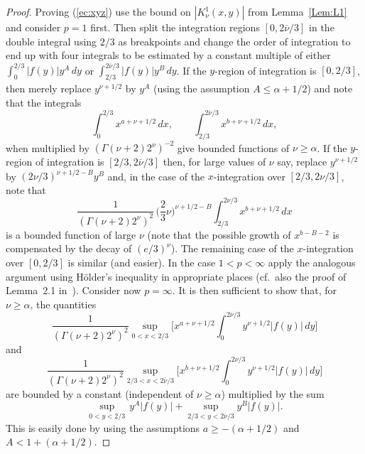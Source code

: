 \documentclass[leqno,a4paper]{amsart}
\newcommand{\overnu}{\overline{\nu}}
\begin{document}
\begin{proof}
Proving (\ref{ec:xyz}) use the bound on $|K_\nu^1(x,y)|$ from
Lemma~\ref{Lem:L1} and consider $p=1$ first. Then split the integration
regions $[0,2\overnu/3]$ in the double integral using $2/3$ as
breakpoints and change
the order of integration to end up with four integrals to be estimated by
a constant multiple of either
$\int_0^{2/3}|f(y)|y^A\,dy$ or $\int_{2/3}^{2\overnu/3}|f(y)|y^B\,dy$.
If the $y$-region of integration is $[0,2/3]$, then merely replace $y^{\nu+1/2}$
by $y^A$ (using the assumption $A\le \alpha+1/2$) and note that the integrals
\begin{equation*}
\int_0^{2/3}x^{a+\nu+1/2}\,dx,
\qquad \int_{2/3}^{2\overnu/3} x^{b+\nu+1/2}\,dx,
\end{equation*}
when multiplied by $(\Gamma(\nu+2)2^{\nu})^{-2}$ give
bounded functions of $\nu\ge\alpha$. If the $y$-region of integration is $[2/3,
2\overnu/3]$ then, for large values of $\nu$ say, replace $y^{\nu+1/2}$
by $(2\nu/3)^{\nu+1/2-B}y^B$ and, in the case of the $x$-integration over
$[2/3,2\nu/3]$, note that
\begin{equation*}
\frac1{(\Gamma(\nu+2)2^{\nu})^2}
\,\Big(\frac23\nu\Big)^{\nu+1/2-B}\int_{2/3}^{2\nu/3} x^{b+\nu+1/2}\,dx
\end{equation*}
is a bounded function of large $\nu$ (note that the possible growth of
$x^{b-B-2}$ is compensated by the decay of $(e/3)^\nu$).
The remaining case of the $x$-integration over $[0,2/3]$ is similar (and easier).
In the case $1<p<\infty$ apply the analogous argument using H\"older's
inequality in appropriate places (cf.\ also the proof of Lemma~2.1
in~\cite{St}). Consider now $p=\infty$.
It is then sufficient to show that, for $\nu\ge\alpha$, the quantities
\begin{equation*}
\frac{1}{(\Gamma(\nu+2)2^{\nu})^2}\sup_{0<x<2/3}\bigg[x^{a+\nu+1/2}
\int_0^{2\overnu/3}y^{\nu+1/2}|f(y)|\,dy\bigg]
\end{equation*}
and
\begin{equation*}
\frac{1}{(\Gamma(\nu+2)2^{\nu})^2}\sup_{2/3<x<2\overnu/3}\bigg[x^
{b+\nu+1/2}\int_0^{2\overnu/3}y^{\nu+1/2}|f(y)|\,dy\bigg]
\end{equation*}
are bounded by a constant (independent of $\nu\ge\alpha$) multiplied by the sum
\begin{equation*}
\sup_{0<y<2/3}\,y^A|f(y)| + \sup_{2/3<y<2\overnu/3}y^B|f(y)|.
\end{equation*}
This is easily done by using the assumptions $a\ge-(\alpha+1/2)$ and
$A<1+(\alpha+1/2)$.


\end{proof}
\end{document}
